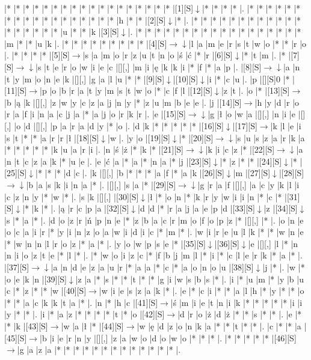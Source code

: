 \documentclass[11pt]{article}
\newcommand\drarr{$\rightarrow \!\!\!\!\! \downarrow$}
\newcommand\rarr{$\rightarrow$}
\newcommand\darr{$\downarrow$}
\begin{document}
\noindent\begin{Puzzle}{22}{33}|*	|*	|*	|*	|*	|*	|*	|*	|*	|*	|*	|*	|*	|*	|*	|*	|*	|*	|[1][S]\darr	|*	|*	|*	|*	|.
|*	|*	|*	|*	|*	|*	|*	|*	|*	|*	|*	|*	|*	|*	|*	|*	|*	|*	|h	|*	|*	|[2][S]\darr	|*	|.
|*	|*	|*	|*	|*	|*	|*	|*	|*	|*	|*	|*	|*	|*	|*	|*	|*	|*	|u	|*	|*	|k	|[3][S]\darr	|.
|*	|*	|*	|*	|*	|*	|*	|*	|*	|*	|*	|*	|*	|*	|*	|*	|*	|*	|m	|*	|*	|u	|k	|.
|*	|*	|*	|*	|*	|*	|*	|*	|*	|[4][S]\drarr	|l	|a	|m	|e	|r	|s	|t	|w	|o	|*	|*	|r	|o	|.
|*	|*	|*	|*	|[5][S]\rarr	|s	|a	|m	|o	|r	|z	|u	|t	|n	|o	|ś	|ć	|*	|r	|[6][S]\darr	|*	|t	|m	|.
|*	|[7][S]\drarr	|s	|t	|e	|r	|o	|w	|i	|e	|c	|[][,]{ }	|m	|i	|ę	|k	|k	|i	|*	|f	|*	|a	|p	|.
|[8][S]\drarr	|a	|n	|t	|y	|m	|o	|n	|e	|k	|[][,]{ }	|g	|a	|l	|u	|*	|*	|[9][S]\darr	|[10][S]\darr	|i	|*	|c	|u	|.
|p	|[][S]0	|*	|[11][S]\rarr	|p	|o	|b	|r	|a	|t	|y	|m	|s	|t	|w	|o	|*	|c	|f	|l	|[12][S]\darr	|z	|t	|.
|o	|*	|[13][S]\rarr	|b	|ą	|k	|[][,]{ }	|z	|w	|y	|c	|z	|a	|j	|n	|y	|*	|z	|u	|m	|b	|e	|e	|.
|j	|[14][S]\rarr	|h	|y	|d	|r	|o	|r	|a	|f	|i	|n	|a	|c	|j	|a	|*	|a	|j	|o	|r	|k	|r	|.
|e	|[15][S]\drarr	|g	|ł	|o	|w	|a	|[][,]{ }	|n	|i	|e	|[][,]{ }	|o	|d	|[][,]{ }	|p	|a	|r	|a	|d	|y	|*	|o	|.
|d	|k	|*	|*	|*	|*	|*	|[16][S]\darr	|[17][S]\rarr	|k	|l	|e	|i	|s	|t	|*	|*	|a	|r	|r	|ł	|[18][S]\darr	|w	|.
|y	|o	|[19][S]\darr	|*	|[20][S]\drarr	|s	|u	|s	|z	|a	|r	|k	|a	|*	|*	|*	|*	|*	|k	|u	|a	|r	|i	|.
|n	|ś	|ż	|*	|k	|*	|[21][S]\drarr	|k	|i	|c	|z	|*	|[22][S]\drarr	|a	|n	|t	|c	|z	|a	|k	|*	|u	|e	|.
|e	|ć	|a	|*	|a	|*	|n	|a	|*	|j	|[23][S]\darr	|*	|z	|*	|*	|[24][S]\darr	|*	|[25][S]\darr	|*	|*	|*	|d	|c	|.
|k	|[][,]{ }	|b	|*	|*	|*	|a	|f	|*	|a	|k	|[26][S]\darr	|m	|[27][S]\darr	|[28][S]\drarr	|b	|a	|s	|k	|i	|n	|a	|*	|.
|[][,]{ }	|s	|a	|*	|[29][S]\drarr	|g	|r	|a	|f	|[][,]{ }	|a	|c	|y	|k	|l	|i	|c	|z	|n	|y	|*	|w	|*	|.
|s	|k	|[][,]{ }	|[30][S]\darr	|ł	|*	|o	|n	|*	|k	|r	|y	|w	|i	|i	|n	|*	|c	|*	|[31][S]\darr	|*	|k	|*	|.
|ą	|r	|c	|p	|a	|[32][S]\darr	|d	|d	|*	|r	|a	|j	|a	|e	|p	|d	|[33][S]\darr	|z	|[34][S]\darr	|s	|*	|a	|*	|.
|d	|o	|z	|r	|ń	|p	|n	|e	|*	|z	|b	|a	|c	|r	|m	|o	|f	|o	|p	|z	|*	|[][,]{ }	|*	|.
|o	|n	|e	|o	|c	|a	|i	|r	|*	|y	|i	|n	|z	|o	|a	|w	|i	|d	|i	|c	|*	|m	|*	|.
|w	|i	|r	|e	|u	|l	|k	|*	|*	|w	|n	|e	|*	|w	|n	|n	|l	|r	|o	|z	|*	|a	|*	|.
|y	|o	|w	|p	|s	|e	|*	|[35][S]\darr	|[36][S]\darr	|e	|[][,]{ }	|l	|*	|n	|n	|i	|o	|z	|t	|e	|*	|l	|*	|.
|*	|w	|o	|i	|z	|c	|*	|f	|b	|j	|m	|l	|*	|i	|*	|c	|l	|e	|r	|k	|*	|a	|*	|.
|[37][S]\drarr	|a	|n	|d	|e	|z	|a	|u	|r	|*	|a	|a	|*	|c	|*	|a	|o	|n	|o	|u	|[38][S]\darr	|j	|*	|.
|w	|*	|o	|e	|k	|n	|[39][S]\darr	|z	|a	|*	|s	|*	|*	|t	|*	|*	|g	|i	|w	|s	|b	|s	|*	|.
|i	|*	|u	|m	|*	|y	|b	|u	|c	|*	|z	|*	|*	|w	|[40][S]\rarr	|w	|i	|e	|s	|z	|a	|k	|*	|.
|e	|*	|c	|i	|*	|*	|a	|l	|h	|*	|y	|*	|*	|o	|*	|*	|a	|c	|k	|k	|t	|a	|*	|.
|n	|*	|h	|c	|[41][S]\rarr	|ś	|m	|i	|e	|t	|n	|i	|k	|*	|*	|*	|*	|*	|i	|i	|y	|*	|*	|.
|i	|*	|a	|z	|*	|*	|*	|*	|t	|*	|o	|[42][S]\rarr	|d	|r	|o	|ż	|d	|ż	|*	|*	|s	|*	|*	|.
|e	|*	|*	|k	|[43][S]\rarr	|w	|a	|ł	|*	|[44][S]\rarr	|w	|ę	|d	|z	|o	|n	|k	|a	|*	|*	|t	|*	|*	|.
|c	|*	|*	|a	|[45][S]\rarr	|b	|i	|e	|r	|n	|y	|[][,]{ }	|z	|a	|w	|o	|d	|o	|w	|o	|*	|*	|*	|.
|*	|*	|*	|*	|*	|[46][S]\rarr	|g	|a	|z	|a	|*	|*	|*	|*	|*	|*	|*	|*	|*	|*	|*	|*	|*	|.\end{Puzzle}
\end{document}
